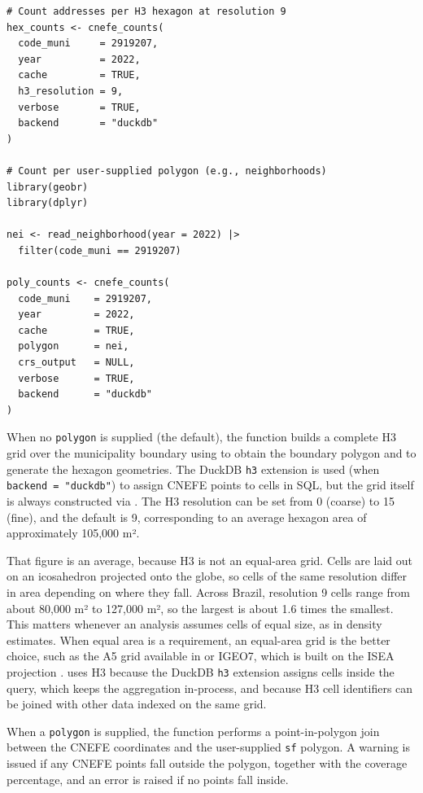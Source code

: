\begin{verbatim}
# Count addresses per H3 hexagon at resolution 9
hex_counts <- cnefe_counts(
  code_muni     = 2919207,
  year          = 2022,
  cache         = TRUE,
  h3_resolution = 9,
  verbose       = TRUE,
  backend       = "duckdb"
)

# Count per user-supplied polygon (e.g., neighborhoods)
library(geobr)
library(dplyr)

nei <- read_neighborhood(year = 2022) |> 
  filter(code_muni == 2919207)

poly_counts <- cnefe_counts(
  code_muni    = 2919207,
  year         = 2022,
  cache        = TRUE,
  polygon      = nei,
  crs_output   = NULL,
  verbose      = TRUE,
  backend      = "duckdb"
)
\end{verbatim}

When no \texttt{polygon} is supplied (the default), the function builds a
complete H3 grid over the municipality boundary using  to obtain the
boundary polygon and  to generate the hexagon geometries.
The DuckDB \texttt{h3} extension is used (when \texttt{backend\ =\ "duckdb"}) to assign
CNEFE points to cells in SQL, but the grid itself is always constructed
via . The H3 resolution can be set from 0 (coarse) to 15
(fine), and the default is 9, corresponding to an average hexagon area
of approximately 105,000 m².

That figure is an average, because H3 is not an equal-area grid. Cells
are laid out on an icosahedron projected onto the globe, so cells of the
same resolution differ in area depending on where they fall. Across
Brazil, resolution 9 cells range from about 80,000 m² to 127,000 m², so
the largest is about 1.6 times the smallest. This matters whenever an
analysis assumes cells of equal size, as in density estimates. When
equal area is a requirement, an equal-area grid is the better choice,
such as the A5 grid available in  \citep{a5r2026} or IGEO7,
which is built on the ISEA projection \citep{kmoch2025}. 
uses H3 because the DuckDB \texttt{h3} extension assigns cells inside the
query, which keeps the aggregation in-process, and because H3 cell
identifiers can be joined with other data indexed on the same grid.

When a \texttt{polygon} is supplied, the function performs a point-in-polygon
join between the CNEFE coordinates and the user-supplied \texttt{sf} polygon. A
warning is issued if any CNEFE points fall outside the polygon, together
with the coverage percentage, and an error is raised if no points fall
inside.


